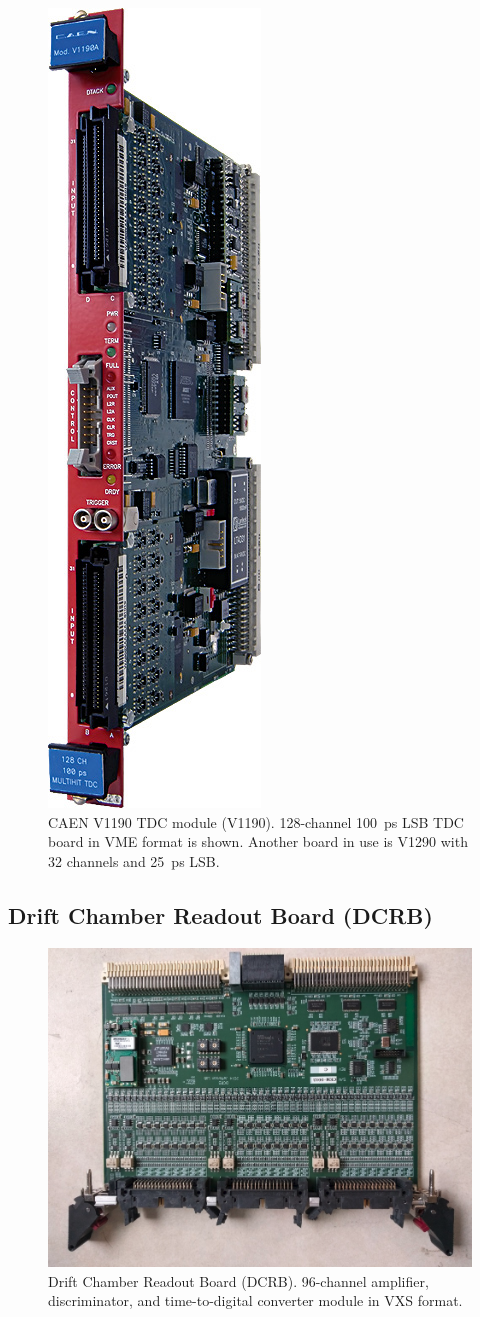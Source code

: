 \begin{figure}[hbt]
	\centering
	\includegraphics[width=0.2\columnwidth,keepaspectratio]{img/v1190_board.jpg}
	\caption{CAEN V1190 TDC module (V1190). 128-channel 100~ps LSB TDC board in VME format is shown. Another board in use is V1290 with 32 channels and 25~ps LSB.}
	\label{fig:v1190_board}
\end{figure}

\subsection{Drift Chamber Readout Board (DCRB)}

\begin{figure}[hbt]
	\centering
	\includegraphics[width=1.0\columnwidth,keepaspectratio]{img/dcrb_board.png}
	\caption{Drift Chamber Readout Board (DCRB). 96-channel amplifier, discriminator, and time-to-digital converter module in VXS format.}
	\label{fig:dcrb_board}
\end{figure}

